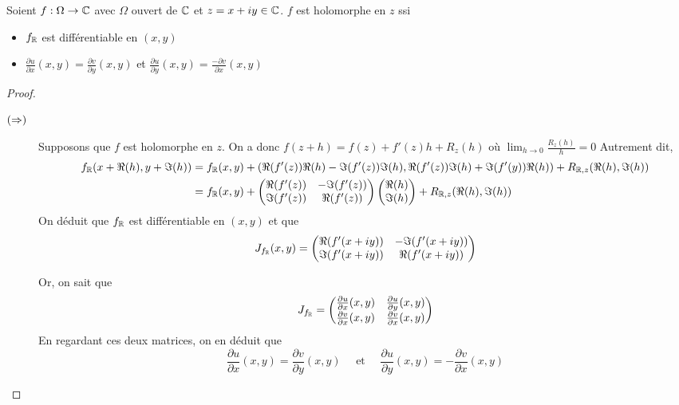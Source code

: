 \begin{theoreme}
    Soient $f:\Omega\to \mathbb{C}$ avec $\Omega$ ouvert de $\mathbb{C}$ et $z = x+iy\in \mathbb{C}$.
    $f$ est holomorphe en $z$ ssi 
    \begin{itemize}
        \item  $f_{\mathbb{R}}$ est différentiable en $(x,y)$
        \item  $\frac{\partial u}{\partial x}(x,y)= \frac{\partial v}{\partial y}(x,y)$ et $\frac{\partial u}{\partial y}(x,y)= \frac{-\partial v}{\partial x}(x,y)$
    \end{itemize}
\end{theoreme}
\begin{proof}
\begin{description}
    \item[$(\Rightarrow)$]  Supposons que $f$ est holomorphe en $z$. On a donc $f(z+h) = f(z) + f'(z)  h + R_z(h)$ où $\lim_{h\to 0}\frac{R_z(h)}{h} = 0$
    Autrement dit, 
    \begin{align*}
    f_{\mathbb{R}} (x+ \Re(h), y + \Im(h))&= f_{\mathbb{R}}(x,y)+ \left( \Re(f'(z) )\Re(h)- \Im (f'(z))\Im(h), \Re(f'(z)) \Im(h) + \Im(f'(y))\Re(h)  \right) + R_{\mathbb{R}, z}(\Re(h), \Im(h))\\
    &= f_{\mathbb{R}}(x,y)+  \begin{pmatrix}
        \Re(f'(z)) & - \Im(f'(z)) \\ \Im(f'(z)) & \Re(f'(z))
    \end{pmatrix}\begin{pmatrix}
        \Re(h)\\ \Im(h)
    \end{pmatrix}
+R_{\mathbb{R}, z}(\Re(h), \Im(h)) 
    \end{align*}   
On déduit que $f_{\mathbb{R}}$ est différentiable en $(x,y)$ et que 
$$
J_{f_{\mathbb{R}}}(x,y)= \begin{pmatrix}
    \Re(f'(x+i y)) & - \Im(f'(x+iy)) \\ \Im(f'(x+iy)) & \Re(f'(x+iy))
\end{pmatrix}
$$

Or, on sait que 
$$
    J_{f_{\mathbb{R}}} = \begin{pmatrix}
        \frac{\partial u}{\partial x}(x,y) & \frac{\partial u}{\partial y}(x,y)\\
        \frac{\partial v}{\partial x}(x,y) & \frac{\partial v}{\partial x}(x,y)
    \end{pmatrix}
$$
En regardant ces deux matrices, on en déduit que 
$$
\frac{\partial u}{\partial x}(x,y)= \frac{\partial v}{\partial y}(x,y) \quad \text{ et } \quad \frac{\partial u}{\partial y}(x,y)= -\frac{\partial v}{\partial x}(x,y)
$$
\end{description}
   
\end{proof}

